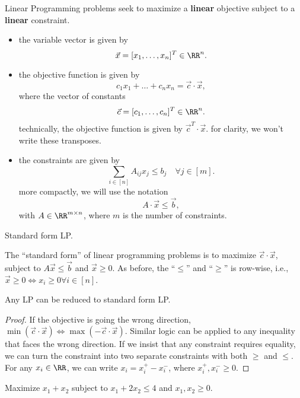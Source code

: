 \begin{definition}

\ac{Linear Programming} problems seek to maximize a \textbf{linear} objective subject to a \textbf{linear} constraint. 
\end{definition}

\begin{itemize}
    \item the variable vector is given by
    \[\Vec{x} = [x_1, \hdots, x_n]^T \in \RR^n.\]
    \item the objective function is given by 
    \[c_1x_1+\hdots + c_nx_n = \Vec{c}\cdot \Vec{x},\]
    where the vector of constants
    \[\Vec{c} = [c_1, \hdots, c_n]^T \in \RR^n.\]
    technically, the objective function is given by $\Vec{c}^T\cdot \Vec{x}$. for clarity, we won't write these transposes. 
    \item the constraints are given by 
    \[\sum_{i\in [n]}A_{ij}x_j\leq b_j\quad \forall j\in [m].\]
    more compactly, we will use the notation 
    \[A\cdot \Vec{x}\leq \Vec{b},\]
    with $A\in \RR^{m\times n}$, where $m$ is the number of constraints. 
\end{itemize}

\begin{definition}

Standard form LP.
\end{definition}

The ``standard form'' of linear programming problems is to maximize $\Vec{c}\cdot \Vec{x}$, subject to $A\Vec{x}\leq \Vec{b}$ and $\Vec{x}\geq 0$. As before, the ``$\leq$'' and ``$\geq$'' is row-wise, i.e., $\Vec{x}\geq 0\iff x_i\geq 0\forall i\in [n]$. 

\begin{theorem}
\claimlabel

Any LP can be reduced to standard form LP. 
\end{theorem}

\begin{proof}
If the objective is going the wrong direction, $\min{(\Vec{c}\cdot\Vec{x})}\iff \max{(-\Vec{c}\cdot \Vec{x})}$. Similar logic can be applied to any inequality that faces the wrong direction. If we insist that any constraint requires equality, we can turn the constraint into two separate constraints with both $\geq$ and $\leq$. For any $x_i\in \RR$, we can write $x_i=x_i^+ - x_i^-$, where $x_i^+, x_i^-\geq 0$. 
\end{proof}

\begin{example}
\exlabel

Maximize $x_1+x_2$ subject to $x_1+2x_2\leq 4$ and $x_1,x_2\geq 0$. 
\end{example}

